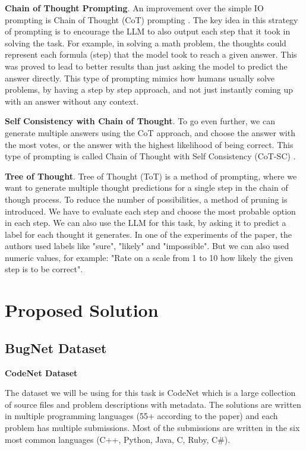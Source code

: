\documentclass[12pt,a4paper]{report}
\begin{document}
\textbf{Chain of Thought Prompting}. An improvement over the simple IO prompting is Chain of Thought (CoT) prompting \cite{wei2023chainofthought}. The key idea in this strategy of prompting is to encourage the LLM to also output each step that it took in solving the task. For example, in solving a math problem, the thoughts could represent each formula (step) that the model took to reach a given answer. This was proved to lead to better results than just asking the model to predict the answer directly. This type of prompting mimics how humans usually solve problems, by having a step by step approach, and not just instantly coming up with an answer without any context.

\textbf{Self Consistency with Chain of Thought}. To go even further, we can generate multiple answers using the CoT approach, and choose the answer with the most votes, or the answer with the highest likelihood of being correct. This type of prompting is called Chain of Thought with Self Consistency (CoT-SC) \cite{wang2023selfconsistency}.

\textbf{Tree of Thought}. Tree of Thought (ToT) \cite{yao2023tree} is a method of prompting, where we want to generate multiple thought predictions for a single step in the chain of though process. To reduce the number of possibilities, a method of pruning is introduced. We have to evaluate each step and choose the most probable option in each step. We can also use the LLM for this task, by asking it to predict a label for each thought it generates. In one of the experiments of the paper, the authors used labels like "sure", "likely" and "impossible". But we can also used numeric values, for example: "Rate on a scale from 1 to 10 how likely the given step is to be correct". 

\chapter{Proposed Solution}

\section{BugNet Dataset}

\textbf{CodeNet Dataset}

The dataset we will be using for this task is CodeNet \cite{puri2021codenet} which is a large collection of source files and problem descriptions with metadata. The solutions are written in multiple programming languages (55+ according to the paper) and each problem has multiple submissions. Most of the submissions are written in the six most common languages (C++, Python, Java, C, Ruby, C\#). 
\end{document}
